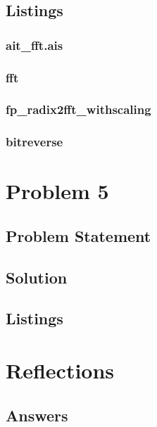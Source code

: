 \documentclass[12pt,a4paper,titlepage,oneside]{article}
\begin{document}
\subsection{Listings}

\subsubsection{ait\_fft.ais}



\subsubsection{fft}



\subsubsection{fp\_radix2fft\_withscaling}



\subsubsection{bitreverse}




\newpage
\section{Problem 5}

\subsection{Problem Statement}


\subsection{Solution}

\subsection{Listings}

\newpage
\section{Reflections}



\subsection{Answers}
\end{document}
